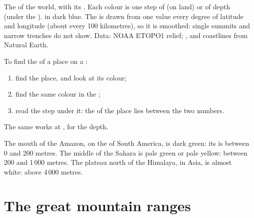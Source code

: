 \begin{omfigure}
{\small The  of the world, with its . Each colour is one
step of  (on land) or of depth (under the ).  in dark
blue. The  is drawn from one value every degree of latitude and
longitude (about every 100 kilometres), so it is smoothed: single summits
and narrow trenches do not show. Data: NOAA ETOPO1 relief; ,  and
coastlines from Natural Earth.}
\label{fig:g4:world-physical-map:map}
\end{omfigure}

\begin{method}\label{met:g4:world-physical-map:reading}
To find the  of a place on a :
\begin{enumerate}
  \item find the place, and look at its colour;
  \item find the same colour in the ;
  \item read the step under it: the  of the place lies between the
        two numbers.
\end{enumerate}
The same works at , for the depth.
\end{method}

\begin{example}\label{ex:g4:world-physical-map:three}
The mouth of the Amazon, on the  of South America, is dark green: its
 is between 0 and 200 metres. The middle of the Sahara is pale
green or pale yellow: between 200 and 1\,000 metres. The plateau north of
the Himalaya, in Asia, is almost white: above 4\,000 metres.
\end{example}

\section{The great mountain ranges}

